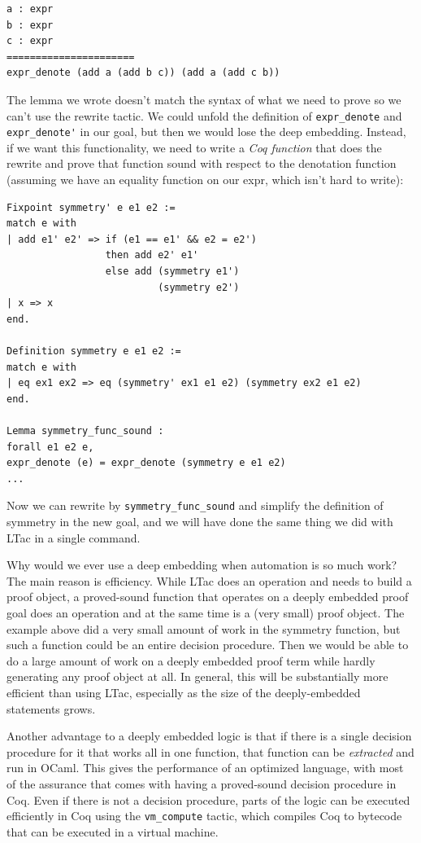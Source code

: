 \documentclass{puthesis}
\begin{document}
\begin{verbatim}
a : expr
b : expr
c : expr
======================
expr_denote (add a (add b c)) (add a (add c b))  
\end{verbatim}

The lemma we wrote doesn't match the syntax of what we need to prove
so we can't use the rewrite tactic. We could unfold the definition of
\lstinline|expr_denote| and \lstinline|expr_denote'| in our goal, but
then we would lose the deep embedding. Instead, if we want this
functionality, we need to write a \emph{Coq function} that does the
rewrite and prove that function sound with respect to the denotation
function (assuming we have an equality function on our expr, which
isn't hard to write):

\begin{verbatim}
Fixpoint symmetry' e e1 e2 := 
match e with
| add e1' e2' => if (e1 == e1' && e2 = e2') 
                 then add e2' e1' 
                 else add (symmetry e1') 
                          (symmetry e2')
| x => x
end.

Definition symmetry e e1 e2 :=
match e with
| eq ex1 ex2 => eq (symmetry' ex1 e1 e2) (symmetry ex2 e1 e2)
end.

Lemma symmetry_func_sound : 
forall e1 e2 e,
expr_denote (e) = expr_denote (symmetry e e1 e2)
...
\end{verbatim}

Now we can rewrite by \lstinline|symmetry_func_sound| and simplify the definition
of symmetry in the new goal, and we will have done the same thing we
did with LTac in a single command.

Why would we ever use a deep embedding when automation is so much
work? The main reason is efficiency. While LTac does an operation and
needs to build a proof object, a proved-sound function that operates on
a deeply embedded proof goal does an operation and at the same time is
a (very small) proof object. The example above did a very small amount
of work in the symmetry function, but such a function could be an
entire decision procedure. Then we would be able to do a large
amount of work on a deeply embedded proof term while hardly generating
any proof object at all. In general, this will be substantially more
efficient than using LTac, especially as the size of the
deeply-embedded statements grows. 

Another advantage to a deeply embedded logic is that if there is a
single decision procedure for it that works all in one function, that
function can be \emph{extracted} and run in OCaml. This gives the
performance of an optimized language, with most of the assurance that
comes with having a proved-sound decision procedure in Coq. Even if
there is not a decision procedure, parts of the logic can be executed
efficiently in Coq using the \lstinline|vm_compute| tactic, which
compiles Coq to bytecode that can be executed in a virtual machine. 
\end{document}
